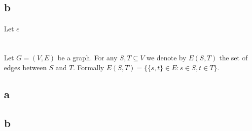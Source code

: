 \documentclass[letterpaper,12pt,oneside,onecolumn]{article}
\begin{document}
\subsection{b}
\paragraph{}
Let $e$

\section{}

\section{}
\paragraph{}
Let $G = (V,E)$ be a graph. For any $S, T \subseteq V$ we denote by $E(S,T)$ the set of edges between $S$ and $T$. Formally $E(S,T) = \{\{s,t\} \in E: s \in S, t \in T\}$.
\subsection{a}

\subsection{b}
\end{document}
